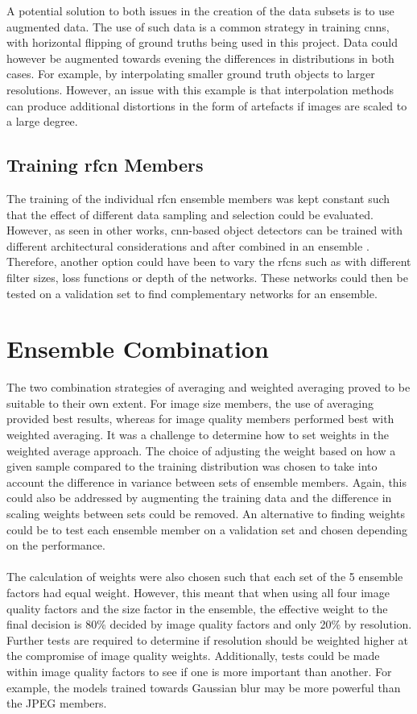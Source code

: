 A potential solution to both issues in the creation of the data subsets is to use augmented data. The use of such data is a common strategy in training \glspl{cnn}, with horizontal flipping of ground truths being used in this project. Data could however be augmented towards evening the differences in distributions in both cases. For example, by interpolating smaller ground truth objects to larger resolutions. However, an issue with this example is that interpolation methods can produce additional distortions in the form of artefacts if images are scaled to a large degree.

\subsection{Training \gls{rfcn} Members}
The training of the individual \gls{rfcn} ensemble members was kept constant such that the effect of different data sampling and selection could be evaluated. However, as seen in other works, \gls{cnn}-based object detectors can be trained with different architectural considerations and after combined in an ensemble \cite{deepres}. Therefore, another option could have been to vary the \glspl{rfcn} such as with different filter sizes, loss functions or depth of the networks. These networks could then be tested on a validation set to find complementary networks for an ensemble.

\section{Ensemble Combination}
The two combination strategies of averaging and weighted averaging proved to be suitable to their own extent. For image size members, the use of averaging provided best results, whereas for image quality members performed best with weighted averaging. It was a challenge to determine how to set weights in the weighted average approach. The choice of adjusting the weight based on how a given sample compared to the training distribution was chosen to take into account the difference in variance between sets of ensemble members. Again, this could also be addressed by augmenting the training data and the difference in scaling weights between sets could be removed. An alternative to finding weights could be to test each ensemble member on a validation set and chosen depending on the performance.
\\\\
The calculation of weights were also chosen such that each set of the 5 ensemble factors had equal weight. However, this meant that when using all four image quality factors and the size factor in the ensemble, the effective weight to the final decision is 80\% decided by image quality factors and only 20\% by resolution. Further tests are required to determine if resolution should be weighted higher at the compromise of image quality weights. Additionally, tests could be made within image quality factors to see if one is more important than another. For example, the models trained towards Gaussian blur may be more powerful than the JPEG members.

